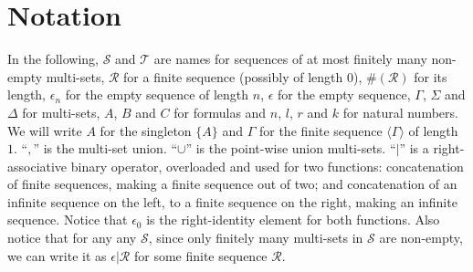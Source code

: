 \section{Notation} In the following, $\mathcal{S}$ and $\mathcal{T}$ are names for sequences of at most finitely many non-empty multi-sets, $\mathcal{R}$ for a finite sequence (possibly of length $0$), $\#(\mathcal{R})$ for its length, $\epsilon_n$ for the empty sequence of length $n$, $\epsilon$ for the empty sequence, $\Gamma$, $\Sigma$ and $\Delta$ for multi-sets, $A$, $B$ and $C$ for formulas and $n$, $l$, $r$ and $k$ for natural numbers. We will write $A$ for the singleton $\{A\}$ and $\Gamma$ for the finite sequence $\langle\Gamma\rangle$ of length $1$.
``$,$'' is the multi-set union.
``$\cup$'' is the point-wise union multi-sets.
``$|$'' is a right-associative binary operator, overloaded and used for two functions: concatenation of finite sequences, making a finite sequence out of two; and concatenation of an infinite sequence on the left, to a finite sequence on the right, making an infinite sequence. Notice that $\epsilon_0$ is the right-identity element for both functions. Also notice that for any  any $\mathcal{S}$, since only finitely many multi-sets in $\mathcal{S}$ are non-empty, we can write it as $\epsilon | \mathcal{R}$ for some finite sequence $\mathcal{R}$.

